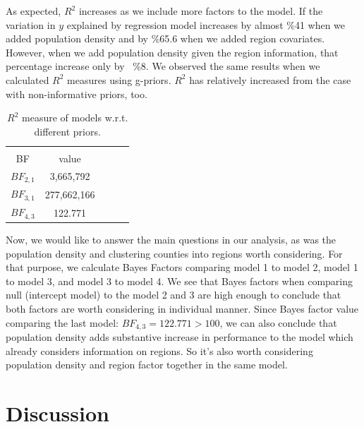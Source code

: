 \documentclass[11pt,twocolumn]{asaproc}
\begin{document}
As expected, $R^2$ increases as we include more factors to the model. If the variation in $y$ explained by regression model increases by almost \%41 when we added population density and by \%65.6 when we added region covariates. However, when we add population density given the region information, that percentage increase only by ~\%8. We observed the same results when we calculated $R^2$ measures using g-priors. $R^2$ has relatively increased from the case with non-informative priors, too. 


\begin{table}
\caption{$R^2$ measure of models w.r.t. different priors.}
\label{tab:infectionss}
\begin{center}
\begin{tabular}{ccccc}
\hline
\hline
\\[-5pt]
\multicolumn{1}{c}{BF} &
\multicolumn{1}{c}{value}\\
\hline
$BF_{2,1}$ &	3,665,792\\
$BF_{3,1}$ &	277,662,166\\
$BF_{4,3}$ &	122.771\\
\hline
\end{tabular}
\end{center}
\end{table}


Now, we would like to answer the main questions in our analysis, as was the population density and clustering counties into regions worth considering. For that purpose, we calculate Bayes Factors comparing model 1 to model 2, model 1 to model 3, and model 3 to model 4. We see that Bayes factors when comparing null (intercept model) to the model 2 and 3 are high enough to conclude that both factors are worth considering in individual manner. Since Bayes factor value comparing the last model: $BF_{4,3} = 122.771 > 100$, we can also conclude that population density adds substantive increase in performance to the model which already considers information on regions. So it's also worth considering population density and region factor together in the same model.












\section{Discussion} %
\end{document}
